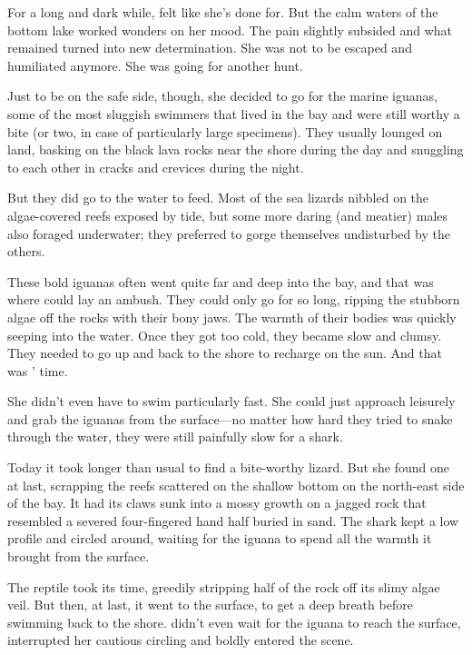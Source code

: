 \mybreak

For a long and dark while, \sharknameformal felt like she's done for. But the calm waters of the bottom lake worked wonders on her mood. The pain slightly subsided and what remained turned into new determination. She was not to be escaped and humiliated anymore. She was going for another hunt. 

Just to be on the safe side, though, she decided to go for the marine iguanas, some of the most sluggish swimmers that lived in the bay and were still worthy a bite (or two, in case of particularly large specimens). They usually lounged on land, basking on the black lava rocks near the shore during the day and snuggling to each other in cracks and crevices during the night. 

But they did go to the water to feed. Most of the sea lizards nibbled on the algae-covered reefs exposed by tide, but some more daring (and meatier) males also foraged underwater; they preferred to gorge themselves undisturbed by the others. 

These bold iguanas often went quite far and deep into the bay, and that was where \sharknameformal could lay an ambush. They could only go for so long, ripping the stubborn algae off the rocks with their bony jaws. The warmth of their bodies was quickly seeping into the water. Once they got too cold, they became slow and clumsy. They needed to go up and back to the shore to recharge on the sun. And that was \sharknameformal' time.

She didn't even have to swim particularly fast. She could just approach leisurely and grab the iguanas from the surface---no matter how hard they tried to snake through the water, they were still painfully slow for a shark.

Today it took \sharknameformal longer than usual to find a bite-worthy lizard. But she found one at last, scrapping the reefs scattered on the shallow bottom on the north-east side of the bay. It had its claws sunk into a mossy growth on a jagged rock that resembled a severed four-fingered hand half buried in sand. The shark kept a low profile and circled around, waiting for the iguana to spend all the warmth it brought from the surface.

The reptile took its time, greedily stripping half of the rock off its slimy algae veil. But then, at last, it went to the surface, to get a deep breath before swimming back to the shore. \sharknameformal didn't even wait for the iguana to reach the surface, interrupted her cautious circling and boldly entered the scene.

